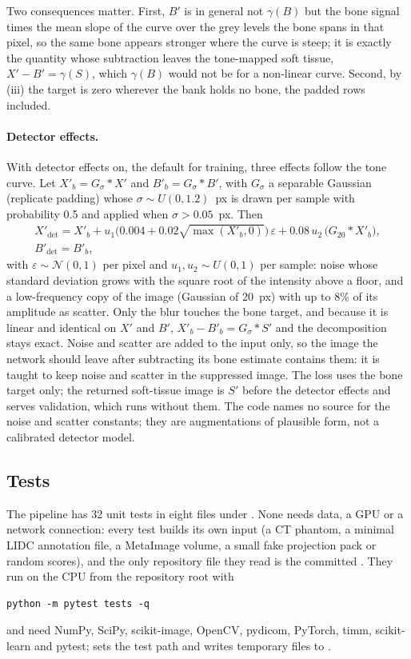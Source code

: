 Two consequences matter. First, $B'$ is in general not $\gamma(B)$ but the bone signal times the mean slope of the curve over the grey levels the
bone spans in that pixel, so the same bone appears stronger where the curve is steep; it is exactly the quantity whose subtraction leaves the
tone-mapped soft tissue, $X'-B'=\gamma(S)$, which $\gamma(B)$ would not be for a non-linear curve. Second, by (iii) the target is zero wherever the
bank holds no bone, the padded rows included.

\paragraph{Detector effects.} With detector effects on, the default for training, three effects follow the tone curve. Let $X'_b=G_\sigma*X'$
and $B'_b=G_\sigma*B'$, with $G_\sigma$ a separable Gaussian (replicate padding) whose $\sigma\sim U(0,1.2)$~px is drawn per sample with
probability 0.5 and applied when $\sigma>0.05$~px. Then
\begin{equation}
\begin{gathered}
X'_{\mathrm{det}} = X'_b + u_1\big(0.004+0.02\sqrt{\max(X'_b,0)}\big)\,\varepsilon + 0.08\,u_2\,\big(G_{20}*X'_b\big),\\
B'_{\mathrm{det}} = B'_b ,
\end{gathered}
\label{eq:dp-detector}
\end{equation}
with $\varepsilon\sim\mathcal N(0,1)$ per pixel and $u_1,u_2\sim U(0,1)$ per sample: noise whose standard deviation grows with the square root of
the intensity above a floor, and a low-frequency copy of the image (Gaussian of 20~px) with up to 8\% of its amplitude as scatter. Only the blur
touches the bone target, and because it is linear and identical on $X'$ and $B'$, $X'_b-B'_b=G_\sigma*S'$ and the decomposition stays exact.
Noise and scatter are added to the input only, so the image the network should leave after subtracting its bone estimate contains them: it is
taught to keep noise and scatter in the suppressed image. The loss uses the bone target only; the returned soft-tissue image is $S'$ before the
detector effects and serves validation, which runs without them. The code names no source for the noise and scatter constants; they are
augmentations of plausible form, not a calibrated detector model.

\subsection{Tests}
\label{ssec:dp-tests}
The pipeline has 32 unit tests in eight files under . None needs data, a GPU or a network connection: every test builds its own
input (a CT phantom, a minimal LIDC annotation file, a MetaImage volume, a small fake projection pack or random scores), and the only repository
file they read is the committed . They run on the CPU from the repository root with
\begin{verbatim}
python -m pytest tests -q
\end{verbatim}
and need NumPy, SciPy, scikit-image, OpenCV, pydicom, PyTorch, timm, scikit-learn and pytest;  sets the test path and writes
temporary files to .

